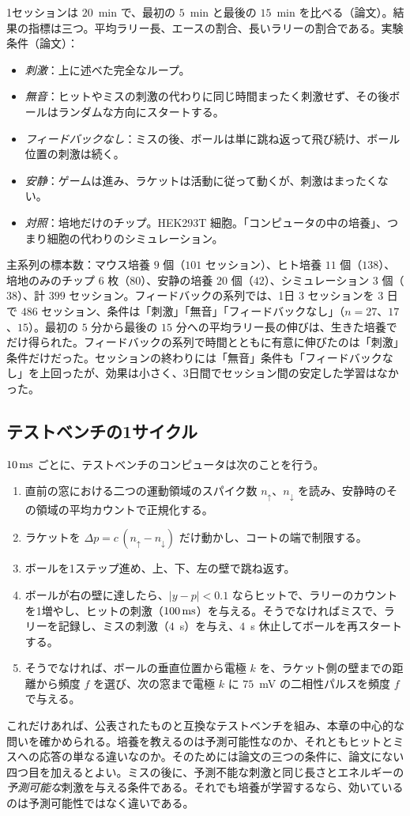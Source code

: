 1セッションは $20$~min で、最初の $5$~min と最後の $15$~min を比べる（論文）。結果の指標は三つ。平均ラリー長、エースの割合、長いラリーの割合である。実験条件（論文）：
\begin{itemize}
\item \emph{刺激}：上に述べた完全なループ。
\item \emph{無音}：ヒットやミスの刺激の代わりに同じ時間まったく刺激せず、その後ボールはランダムな方向にスタートする。
\item \emph{フィードバックなし}：ミスの後、ボールは単に跳ね返って飛び続け、ボール位置の刺激は続く。
\item \emph{安静}：ゲームは進み、ラケットは活動に従って動くが、刺激はまったくない。
\item \emph{対照}：培地だけのチップ。HEK293T 細胞。「コンピュータの中の培養」、つまり細胞の代わりのシミュレーション。
\end{itemize}
主系列の標本数：マウス培養 $9$ 個（$101$ セッション）、ヒト培養 $11$ 個（$138$）、培地のみのチップ $6$ 枚（$80$）、安静の培養 $20$ 個（$42$）、シミュレーション $3$ 個（$38$）、計 $399$ セッション。フィードバックの系列では、1日 $3$ セッションを $3$ 日で $486$ セッション、条件は「刺激」「無音」「フィードバックなし」（$n=27$、$17$、$15$）。最初の $5$ 分から最後の $15$ 分への平均ラリー長の伸びは、生きた培養でだけ得られた。フィードバックの系列で時間とともに有意に伸びたのは「刺激」条件だけだった。セッションの終わりには「無音」条件も「フィードバックなし」を上回ったが、効果は小さく、3日間でセッション間の安定した学習はなかった\cite{Kagan2022}。

\subsection*{テストベンチの1サイクル}

$10\,\text{ms}$ ごとに、テストベンチのコンピュータは次のことを行う。
\begin{enumerate}
\item 直前の窓における二つの運動領域のスパイク数 $n_\uparrow$、$n_\downarrow$ を読み、安静時のその領域の平均カウントで正規化する。
\item ラケットを $\Delta p=c\,(n_\uparrow-n_\downarrow)$ だけ動かし、コートの端で制限する。
\item ボールを1ステップ進め、上、下、左の壁で跳ね返す。
\item ボールが右の壁に達したら、$|y-p|<0.1$ ならヒットで、ラリーのカウントを1増やし、ヒットの刺激（$100\,\text{ms}$）を与える。そうでなければミスで、ラリーを記録し、ミスの刺激（$4$~s）を与え、$4$~s 休止してボールを再スタートする。
\item そうでなければ、ボールの垂直位置から電極 $k$ を、ラケット側の壁までの距離から頻度 $f$ を選び、次の窓まで電極 $k$ に $75$~mV の二相性パルスを頻度 $f$ で与える。
\end{enumerate}
これだけあれば、公表されたものと互換なテストベンチを組み、本章の中心的な問いを確かめられる。培養を教えるのは予測可能性なのか、それともヒットとミスへの応答の単なる違いなのか。そのためには論文の三つの条件に、論文にない四つ目を加えるとよい。ミスの後に、予測不能な刺激と同じ長さとエネルギーの\emph{予測可能な}刺激を与える条件である。それでも培養が学習するなら、効いているのは予測可能性ではなく違いである。
